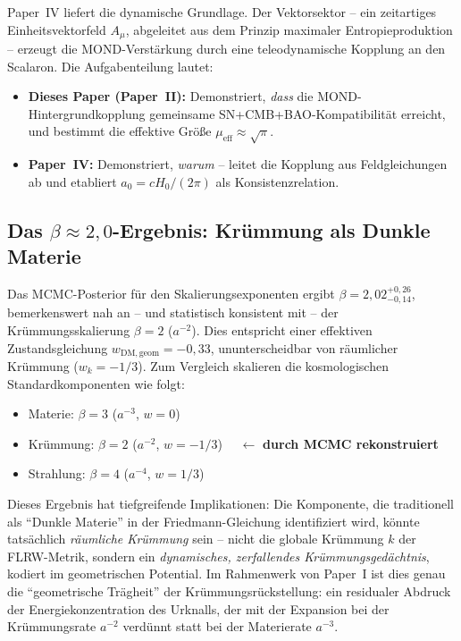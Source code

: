 \documentclass[aps,prd,twocolumn,superscriptaddress,nofootinbib,floatfix]{revtex4-2}
\begin{document}
Paper~IV \cite{Geiger2026d} liefert die dynamische Grundlage. Der Vektorsektor -- ein zeitartiges Einheitsvektorfeld $A_\mu$, abgeleitet aus dem Prinzip maximaler Entropieproduktion -- erzeugt die MOND-Verstärkung durch eine teleodynamische Kopplung an den Scalaron. Die Aufgabenteilung lautet:
\begin{itemize}
\item \textbf{Dieses Paper (Paper~II):} Demonstriert, \emph{dass} die MOND-Hintergrundkopplung gemeinsame SN+CMB+BAO-Kompatibilität erreicht, und bestimmt die effektive Größe $\mu_{\mathrm{eff}} \approx \sqrt{\pi}$.
\item \textbf{Paper~IV:} Demonstriert, \emph{warum} -- leitet die Kopplung aus Feldgleichungen ab und etabliert $a_0 = cH_0/(2\pi)$ als Konsistenzrelation.
\end{itemize}

\subsection{Das \texorpdfstring{$\beta \approx 2{,}0$}{beta approx 2,0}-Ergebnis: Krümmung als Dunkle Materie}

Das MCMC-Posterior für den Skalierungsexponenten ergibt $\beta = 2{,}02^{+0{,}26}_{-0{,}14}$, bemerkenswert nah an -- und statistisch konsistent mit -- der Krümmungsskalierung $\beta = 2$ ($a^{-2}$). Dies entspricht einer effektiven Zustandsgleichung $w_{\mathrm{DM,geom}} = -0{,}33$, ununterscheidbar von räumlicher Krümmung ($w_k = -1/3$). Zum Vergleich skalieren die kosmologischen Standardkomponenten wie folgt:
\begin{itemize}
\item Materie: $\beta = 3$ ($a^{-3}$, $w = 0$)
\item Krümmung: $\beta = 2$ ($a^{-2}$, $w = -1/3$) $\quad\leftarrow$ \textbf{durch MCMC rekonstruiert}
\item Strahlung: $\beta = 4$ ($a^{-4}$, $w = 1/3$)
\end{itemize}

Dieses Ergebnis hat tiefgreifende Implikationen: Die Komponente, die traditionell als "`Dunkle Materie"' in der Friedmann-Gleichung identifiziert wird, könnte tatsächlich \textit{räumliche Krümmung} sein -- nicht die globale Krümmung $k$ der FLRW-Metrik, sondern ein \textit{dynamisches, zerfallendes Krümmungsgedächtnis}, kodiert im geometrischen Potential. Im Rahmenwerk von Paper~I ist dies genau die "`geometrische Trägheit"' der Krümmungsrückstellung: ein residualer Abdruck der Energiekonzentration des Urknalls, der mit der Expansion bei der Krümmungsrate $a^{-2}$ verdünnt statt bei der Materierate $a^{-3}$.
\end{document}
